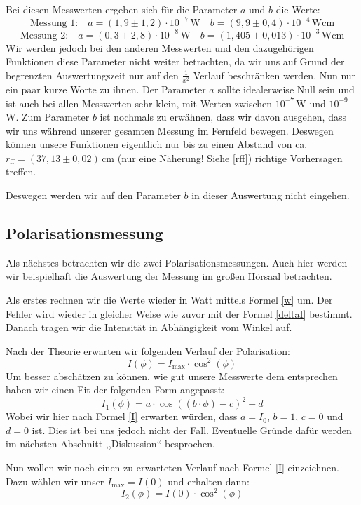 \documentclass[titlepage,11pt,a4paper,ngerman]{article}
\newcommand{\tx}[1]{\textrm{#1}}
\begin{document}
Bei diesen Messwerten ergeben sich für die Parameter $a$ und $b$ die Werte:
\begin{equation*}
\tx{Messung 1:} \quad a = (1{,}9\pm1{,}2)\cdot10^{-7}\,\tx{W} \quad b = (9{,}9\pm0{,}4)\cdot10^{-4}\,\tx{Wcm}
\end{equation*}
\begin{equation*}
\tx{Messung 2:} \quad a = (0{,}3\pm2{,}8)\cdot10^{-8}\,\tx{W} \quad b = (1{,405\pm0{,}013})\cdot10^{-3} \,\tx{Wcm}
\end{equation*}
Wir werden jedoch bei den anderen Messwerten und den dazugehörigen Funktionen diese Parameter nicht weiter betrachten, da wir uns auf Grund der begrenzten Auswertungszeit nur auf den $\frac{1}{x^{2}}$ Verlauf beschränken werden. Nun nur ein paar kurze Worte zu ihnen. Der Parameter $a$ sollte idealerweise Null sein und ist auch bei allen Messwerten sehr klein, mit Werten zwischen $10^{-7}\,$W und $10^{-9}\,$W. Zum Parameter $b$ ist nochmals zu erwähnen, dass wir davon ausgehen, dass wir uns während unserer gesamten Messung im Fernfeld bewegen. Deswegen können unsere Funktionen eigentlich nur bis zu einen Abstand von ca. $r_{\tx{ff}}=(37{,}13\pm0{,}02)\,$cm (nur eine Näherung! Siehe \eqref{rff}) richtige Vorhersagen treffen.  \par 
Deswegen werden wir auf den Parameter $b$ in dieser Auswertung nicht eingehen.

\FloatBarrier

\subsection{Polarisationsmessung}

Als nächstes betrachten wir die zwei Polarisationsmessungen. Auch hier werden wir beispielhaft die Auswertung der Messung im großen Hörsaal betrachten. \par 
Als erstes rechnen wir die Werte wieder in Watt mittels Formel \eqref{w} um. Der Fehler wird wieder in gleicher Weise wie zuvor mit der Formel \eqref{deltaI} bestimmt. Danach tragen wir die Intensität in Abhängigkeit vom Winkel auf. \par 
Nach der Theorie erwarten wir folgenden Verlauf der Polarisation:
\begin{equation}
I(\phi) = I_{\tx{max}}\cdot \cos^{2}(\phi)
\label{I}
\end{equation}
Um besser abschätzen zu können, wie gut unsere Messwerte dem entsprechen haben wir einen Fit der folgenden Form angepasst:
\begin{equation}
I_{1}(\phi) = a \cdot \cos((b \cdot\phi) - c)^{2} + d
\label{I1}
\end{equation}
Wobei wir hier nach Formel \eqref{I} erwarten würden, dass $a=I_{0}$, $b=1$, $c=0$ und $d=0$ ist. Dies ist bei uns jedoch nicht der Fall. Eventuelle Gründe dafür werden im nächsten Abschnitt ,,Diskussion`` besprochen. \par 
Nun wollen wir noch einen zu erwarteten Verlauf nach Formel \eqref{I} einzeichnen. Dazu wählen wir unser $I_{\tx{max}}=I(0)$ und erhalten dann:
\begin{equation}
I_{2}(\phi) = I(0)\cdot \cos^{2}(\phi)
\label{I2}
\end{equation}
\end{document}

